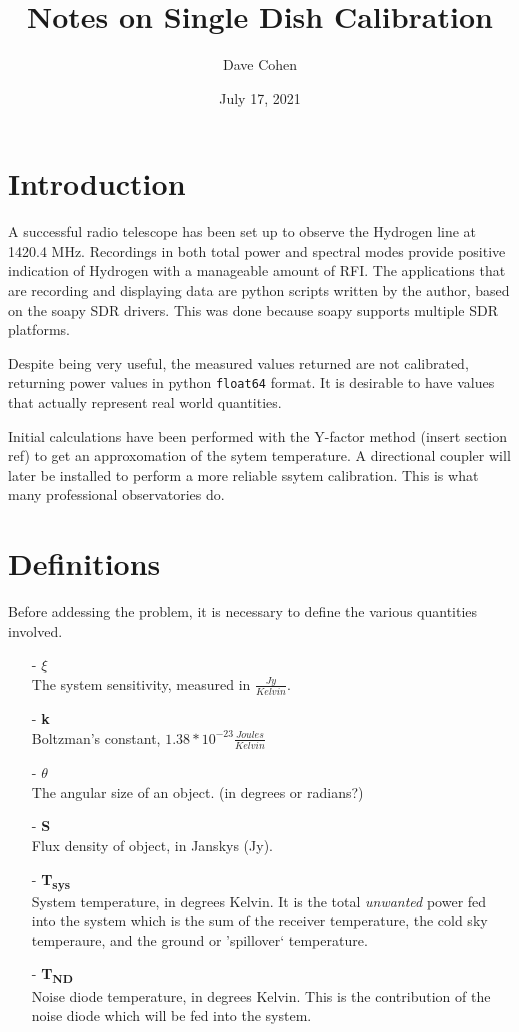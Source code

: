 \documentclass[letterpaper, 12pt]{article}
\begin{document}
\title{Notes on Single Dish Calibration}
\author{Dave Cohen}
\date{July 17, 2021}
\maketitle

\tableofcontents
\newpage
{}

\section{Introduction}
A successful radio telescope has been set up to observe the Hydrogen line at 1420.4 MHz. Recordings in both total power and spectral modes provide positive indication of Hydrogen with a manageable amount of RFI. The applications that are recording and displaying data are python scripts written by the author, based on the soapy SDR drivers. This was done because soapy supports multiple SDR platforms.

Despite being very useful, the measured values returned are not calibrated, returning power values in python \texttt{float64} format. It is desirable to have values that actually represent real world quantities.

Initial calculations have been performed with the Y-factor method {\color{red}(insert section ref)} to get an approxomation of the sytem temperature.  A directional coupler will later be installed to perform a more reliable ssytem calibration.  This is what many professional observatories do.

\section{Definitions}
Before addessing the problem, it is necessary to define the various quantities involved.

\begin{itemize}
	\item[-] \textbf{$\xi$}
	\\The system sensitivity, measured in $\frac{Jy}{Kelvin}$.
	\item[-] \textbf{k}
		\\Boltzman's constant, $1.38 * 10^{-23} \frac{Joules}{Kelvin}$
	\item[-] \textbf{$\theta$}
		\\The angular size of an object. {\color{red}(in degrees or radians?)}
	\item[-] \textbf{S}
		\\Flux density of object, in Janskys (Jy).
	\item[-] \textbf{T\textsubscript{sys}}
		\\System temperature, in degrees Kelvin. It is the total \textit{unwanted} power fed into the system which is the sum of the receiver temperature, the cold sky temperaure, and the ground or 'spillover` temperature.
	\item[-]\textbf{T\textsubscript{ND}}
		\\Noise diode temperature, in degrees Kelvin. This is the contribution of the noise diode which will be fed into the system.
\end{itemize}
\end{document}
